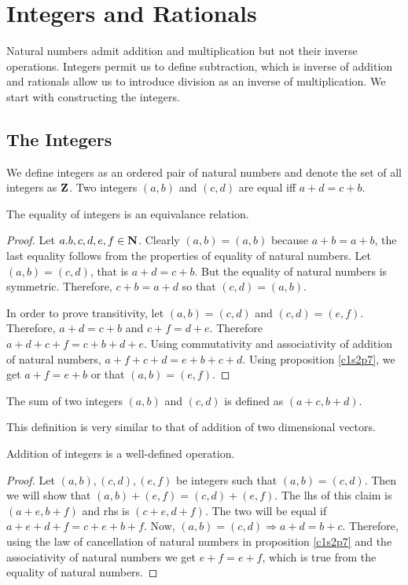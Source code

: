 \chapter{Integers and Rationals}\label{c3}
Natural numbers admit addition and multiplication but not their inverse
operations. Integers permit us to define subtraction, which is inverse of 
addition and rationals allow us to introduce division as an inverse of
multiplication. We start with constructing the integers.

\section{The Integers}\label{c3s1}
\begin{defn}\label{c3s1d1}
We define integers as an ordered pair of natural numbers and denote the 
set of all integers as $\mathbf{Z}$. Two integers $(a, b)$ and $(c, d)$ are 
equal iff $a + d = c + b$.
\end{defn}

\begin{lem}\label{c3s1l1}
The equality of integers is an equivalance relation.
\end{lem}
\begin{proof}
Let $a. b, c, d, e, f \in \mathbf{N}$. Clearly $(a, b) = (a, b)$ because $a + b
= a + b$, the last equality follows from the properties of equality of 
natural numbers. Let $(a, b) = (c, d)$, that is $a + d = c + b$. But the
equality of natural numbers is symmetric. Therefore, $c + b = a + d$ so
that $(c, d) = (a, b)$.

In order to prove transitivity, let $(a, b) = (c, d)$ and $(c, d) = 
(e, f)$. Therefore, $a + d = c + b$ and $c + f = d + e$. Therefore $a + d
+ c + f = c + b + d + e$. Using commutativity and associativity of addition
of natural numbers, $a + f + c + d = e + b + c + d$. Using proposition 
\ref{c1s2p7}, we get $a + f = e + b$ or that $(a, b) = (e, f)$.
\end{proof}

\begin{defn}\label{c3s1d2}
The sum of two integers $(a, b)$ and $(c, d)$ is defined as $(a + c, 
b + d)$.
\end{defn}
\begin{rem}
This definition is very similar to that of addition of two dimensional 
vectors.
\end{rem}

\begin{lem}\label{c3s1l2}
Addition of integers is a well-defined operation.
\end{lem}
\begin{proof}
Let $(a, b), (c, d), (e, f)$ be integers such that $(a, b) = (c, d)$. Then
we will show that $(a, b) + (e, f) = (c, d) + (e, f)$. The lhs of this 
claim is $(a + e, b + f)$ and rhs is $(c + e, d + f)$. The two will be equal
if $a + e + d + f = c + e + b + f$. Now, $(a, b) = (c, d) \Rightarrow 
a + d = b + c$. Therefore, using the law of cancellation of natural numbers
in proposition \ref{c1s2p7} and the associativity of natural numbers we 
get $e + f = e + f$, which is true from the equality of natural numbers.
\end{proof}

